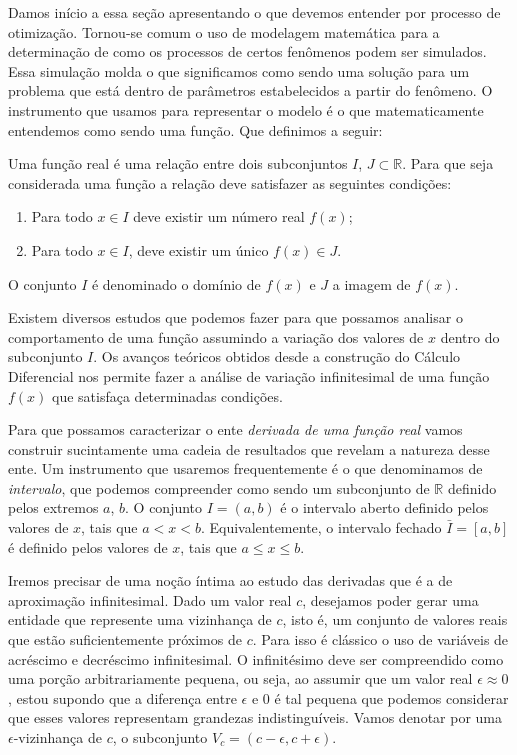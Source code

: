 \noindent
Damos início a essa seção apresentando o que devemos entender por processo de otimização. Tornou-se comum o uso de modelagem matemática para a determinação de como os processos de certos fenômenos podem ser simulados. Essa simulação molda o que significamos como sendo uma solução para um problema que está dentro de parâmetros estabelecidos a partir do fenômeno. O instrumento que usamos para representar o modelo é o que matematicamente entendemos como sendo uma função. Que definimos a seguir:

\begin{definition}
  Uma função real é uma relação entre dois subconjuntos $I$, $J \subset \mathbb{R}$. Para que seja considerada uma função a relação deve satisfazer as seguintes condições:				
  \begin{enumerate}
  \item Para todo $x \in I$ deve existir um número real $f(x)$;
  \item Para todo $x \in I$, deve existir um único $f(x) \in J$.
  \end{enumerate}
  O conjunto $I$ é denominado o domínio de $f(x)$ e $J$ a imagem de $f(x)$.
\end{definition}


\par Existem diversos estudos que podemos fazer para que possamos analisar o comportamento de uma função assumindo a variação dos valores de $x$ dentro do subconjunto $I$. Os avanços teóricos obtidos desde a construção do Cálculo Diferencial nos permite fazer a análise de variação infinitesimal de uma função $f(x)$ que satisfaça determinadas condições. 

\par Para que possamos caracterizar o ente \textit{derivada de uma função real } vamos construir sucintamente uma cadeia de resultados que revelam a natureza desse ente. Um instrumento que usaremos frequentemente é o que denominamos de \textit{intervalo}, que podemos compreender como sendo um subconjunto de $\mathbb{R}$ definido pelos extremos $a$, $b$. O conjunto $I = (a,b)$ é o intervalo aberto definido pelos valores de $x$, tais que $ a < x < b$. Equivalentemente, o intervalo fechado $\bar{I}= [a,b]$ é definido pelos valores de $x$, tais que $a \leq x \leq b$. 

\par Iremos precisar de uma noção íntima ao estudo das derivadas que é a de aproximação infinitesimal. Dado um valor real $c$, desejamos poder gerar uma entidade que represente uma vizinhança de $c$, isto é, um conjunto de valores reais que estão suficientemente próximos de $c$. Para isso é clássico o uso de variáveis de acréscimo e decréscimo infinitesimal. O infinitésimo deve ser compreendido como uma porção arbitrariamente pequena, ou seja, ao assumir que um valor real $\epsilon \approx 0$, estou supondo que a diferença entre $\epsilon$ e $0$ é tal pequena que podemos considerar que esses valores representam grandezas indistinguíveis. Vamos denotar por uma $\epsilon$-vizinhança de $c$, o subconjunto $V_{c} = (c-\epsilon, c+ \epsilon)$. 

